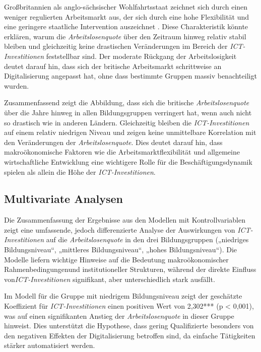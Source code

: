 Großbritannien als anglo-sächsischer Wohlfahrtsstaat zeichnet sich durch einen 
weniger regulierten Arbeitsmarkt aus, der sich durch eine hohe Flexibilität und eine 
geringere staatliche Intervention auszeichnet 
\parencite[vgl.][S. 21]{trabert1997entwicklung}. 
Diese Charakteristik könnte erklären, warum die \textit{Arbeitslosenquote} über den 
Zeitraum hinweg relativ stabil bleiben und gleichzeitig keine drastischen Veränderungen 
im Bereich der \textit{\ac{ICT}-Investitionen} feststellbar sind. Der moderate Rückgang 
der Arbeitslosigkeit deutet darauf hin, dass sich der britische Arbeitsmarkt schrittweise 
an Digitalisierung angepasst hat, ohne dass bestimmte Gruppen massiv benachteiligt wurden.

Zusammenfassend zeigt die Abbildung, dass sich die britische \textit{Arbeitslosenquote} 
über die Jahre hinweg in allen Bildungsgruppen verringert hat, wenn auch nicht so drastisch 
wie in anderen Ländern. Gleichzeitig bleiben die \textit{\ac{ICT}-Investitionen} auf einem 
relativ niedrigen Niveau und zeigen keine unmittelbare Korrelation mit den Veränderungen 
der \textit{Arbeitslosenquote}. Dies deutet darauf hin, dass makroökonomische Faktoren wie 
die Arbeitsmarktflexibilität und allgemeine wirtschaftliche Entwicklung eine wichtigere 
Rolle für die Beschäftigungsdynamik spielen als allein die Höhe der 
\textit{\ac{ICT}-Investitionen}.


\subsection{Multivariate Analysen}

Die Zusammenfassung der Ergebnisse aus den Modellen mit Kontrollvariablen zeigt eine 
umfassende, jedoch differenzierte Analyse der Auswirkungen von 
\textit{\ac{ICT}-Investitionen} auf die \textit{Arbeitslosenquote} in den drei 
Bildungsgruppen („niedriges Bildungsniveau“, „mittleres Bildungsniveau“, „hohes 
Bildungsniveau“). Die Modelle liefern wichtige Hinweise auf die Bedeutung 
makroökonomischer Rahmenbedingungenund institutioneller Strukturen, während der direkte 
Einfluss von\textit{\ac{ICT}-Investitionen} signifikant, aber unterschiedlich stark 
ausfällt.



Im Modell für die Gruppe mit niedrigem Bildungsniveau zeigt der geschätzte Koeffizient 
für \textit{\ac{ICT}-Investitionen} einen positiven Wert von 2,302*** (p < 0,001), was 
auf einen signifikanten Anstieg der \textit{Arbeitslosenquote} in dieser Gruppe hinweist. 
Dies unterstützt die Hypothese, dass gering Qualifizierte besonders von den negativen 
Effekten der Digitalisierung betroffen sind, da einfache Tätigkeiten stärker automatisiert 
werden.

